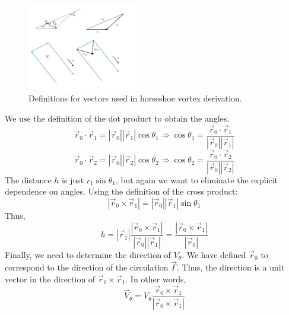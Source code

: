 \documentclass{article}
\begin{document}
\begin{figure}[htbp]
\centering
\includegraphics[width=2in]{figs/vectordef}
\caption{Definitions for vectors used in horseshoe vortex derivation.}
\label{fig:vectordef}
\end{figure}

We use the definition of the dot product to obtain the angles.
\begin{equation}
\vec{r}_0 \cdot \vec{r}_1 = |\vec{r}_0||\vec{r}_1| \cos\theta_1 \Rightarrow \cos\theta_1 = \frac{\vec{r}_0 \cdot \vec{r}_1}{|\vec{r}_0||\vec{r}_1|}
\end{equation}
\begin{equation}
\vec{r}_0 \cdot \vec{r}_2 = |\vec{r}_0||\vec{r}_2|  \cos\theta_2
\Rightarrow \cos\theta_2 = \frac{\vec{r}_0 \cdot \vec{r}_2}{|\vec{r}_0||\vec{r}_2|}
\end{equation}
The distance $h$ is just $r_1 \sin\theta_1$, but again we want to eliminate the explicit dependence on angles.  Using the definition of the cross product:
\begin{equation}
|\vec{r}_0 \times \vec{r}_1 | = |\vec{r}_0| |\vec{r}_1| \sin\theta_1 
\end{equation}
Thus,
\begin{equation}
h = |\vec{r}_1| \frac{|\vec{r}_0 \times \vec{r}_1 |}{|\vec{r}_0| |\vec{r}_1|} = \frac{|\vec{r}_0 \times \vec{r}_1 |}{|\vec{r}_0|}
\end{equation}
Finally, we need to determine the direction of $V_\theta$.  We have defined $\vec{r}_0$ to correspond to the direction of the circulation $\vec\Gamma$.  Thus, the direction is a unit vector in the direction of $\vec{r}_0 \times \vec{r}_1$.  In other words, 
\begin{equation}
\vec{V}_\theta = V_\theta \frac{\vec{r}_0 \times \vec{r}_1}{|\vec{r}_0 \times \vec{r}_1|}
\end{equation}
\end{document}
